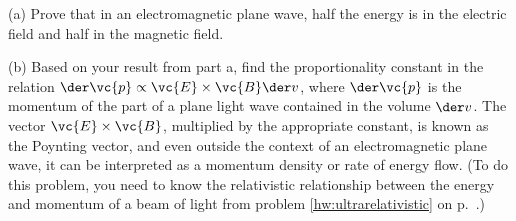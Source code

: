         (a) Prove that in an electromagnetic plane wave, half the energy
        is in the electric field and half in the magnetic field.\hwendpart

(b) Based on your result from part a, find the proportionality
constant in the relation $\der\vc{p}\propto\vc{E}\times\vc{B}\der v$,
where $\der \vc{p}$ is the momentum of the part of a plane light wave
contained in the volume $\der v$. The vector $\vc{E}\times\vc{B}$,
multiplied by the appropriate constant, is known as the Poynting
vector, and even outside the context of an electromagnetic plane wave,
it can be interpreted as a momentum density or rate of
energy flow. (To do this problem, you need to know the relativistic
relationship between the energy and momentum of a beam of
light from problem \ref{hw:ultrarelativistic} on p.~\pageref{hw:ultrarelativistic}.)\answercheck

